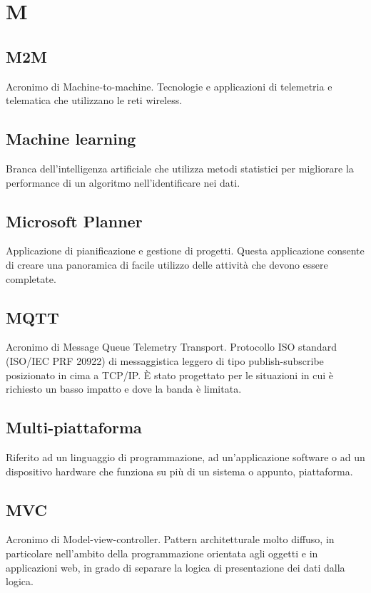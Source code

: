 \section*{M}
\markright{}

\subsection*{M2M}
Acronimo di Machine-to-machine. Tecnologie e applicazioni di telemetria e telematica che utilizzano le reti wireless.

\subsection*{Machine learning}
Branca dell'intelligenza artificiale che utilizza metodi statistici per migliorare la performance di un algoritmo nell'identificare  nei dati.

\subsection*{Microsoft Planner}
Applicazione di pianificazione e gestione di progetti. Questa applicazione consente di creare una panoramica di facile utilizzo delle attività che devono essere completate.

\subsection*{MQTT}
Acronimo di Message Queue Telemetry Transport. Protocollo ISO standard (ISO/IEC PRF 20922) di messaggistica leggero di tipo publish-subscribe posizionato in cima a TCP/IP. È stato progettato per le situazioni in cui è richiesto un basso impatto e dove la banda è limitata. 

\subsection*{Multi-piattaforma}
Riferito ad un linguaggio di programmazione, ad un'applicazione software o ad un dispositivo hardware che funziona su più di un sistema o appunto, piattaforma.

\subsection*{MVC}
Acronimo di Model-view-controller. Pattern architetturale molto diffuso, in particolare nell'ambito della programmazione orientata agli oggetti e in applicazioni web, in grado di separare la logica di presentazione dei dati dalla logica.